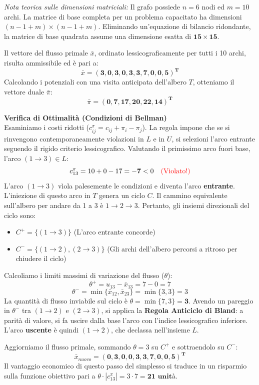 \documentclass[12pt, a4paper]{article}
\begin{document}
	\textit{Nota teorica sulle dimensioni matriciali:} Il grafo possiede $n=6$ nodi ed $m=10$ archi. La matrice di base completa per un problema capacitato ha dimensioni $(n-1+m) \times (n-1+m)$. Eliminando un'equazione di bilancio ridondante, la matrice di base quadrata assume una dimensione esatta di $\mathbf{15 \times 15}$.
	
	Il vettore del flusso primale $\bar{x}$, ordinato lessicograficamente per tutti i 10 archi, risulta ammissibile ed è pari a:
	\[ \bar{x} = \mathbf{(3, 0, 3, 0, 3, 3, 7, 0, 0, 5)^T} \]
	Calcolando i potenziali con una visita anticipata dell'albero $T$, otteniamo il vettore duale $\bar{\pi}$:
	\[ \bar{\pi} = \mathbf{(0, 7, 17, 20, 22, 14)^T} \]
	
	\vspace{0.4cm}
	\textbf{Verifica di Ottimalità (Condizioni di Bellman)}\\
	Esaminiamo i costi ridotti ($c^\pi_{ij} = c_{ij} + \pi_i - \pi_j$). La regola impone che se si rinvengono contemporaneamente violazioni in $L$ e in $U$, si selezioni l'arco entrante seguendo il rigido criterio lessicografico.
	Valutando il primissimo arco fuori base, l'arco $(1\to3) \in L$:
	\[ c^\pi_{13} = 10 + 0 - 17 = \mathbf{-7} < 0 \quad \text{\textcolor{red}{(Violato!)}} \]
	L'arco $(1\to3)$ vìola palesemente le condizioni e diventa l'arco \textbf{entrante}. L'iniezione di questo arco in $T$ genera un ciclo $C$. Il cammino equivalente sull'albero per andare da 1 a 3 è $1 \to 2 \to 3$. Pertanto, gli insiemi direzionali del ciclo sono:
	\begin{itemize}
		\item $C^+ = \{ (1\to3) \}$ (L'arco entrante concorde)
		\item $C^- = \{ (1\to2), (2\to3) \}$ (Gli archi dell'albero percorsi a ritroso per chiudere il ciclo)
	\end{itemize}
	
	Calcoliamo i limiti massimi di variazione del flusso ($\theta$):
	\[ \theta^+ = u_{13} - \bar{x}_{13} = 7 - 0 = 7 \]
	\[ \theta^- = \min \{ \bar{x}_{12}, \bar{x}_{23} \} = \min \{ 3, 3 \} = 3 \]
	La quantità di flusso inviabile sul ciclo è $\theta = \min \{ 7, 3 \} = \mathbf{3}$.
	Avendo un pareggio in $\theta^-$ tra $(1\to2)$ e $(2\to3)$, si applica la \textbf{Regola Anticiclo di Bland}: a parità di valore, si fa uscire dalla base l'arco con l'indice lessicografico inferiore. L'arco \textbf{uscente} è quindi $(1\to2)$, che declassa nell'insieme $L$.
	
	Aggiorniamo il flusso primale, sommando $\theta=3$ su $C^+$ e sottraendolo su $C^-$:
	\[ \bar{x}_{nuovo} = \mathbf{(0, 3, 0, 0, 3, 3, 7, 0, 0, 5)^T} \]
	Il vantaggio economico di questo passo del simplesso si traduce in un risparmio sulla funzione obiettivo pari a $\theta \cdot |c^\pi_{13}| = 3 \cdot 7 = \mathbf{21 \text{ unità}}$.
	
\end{document}
